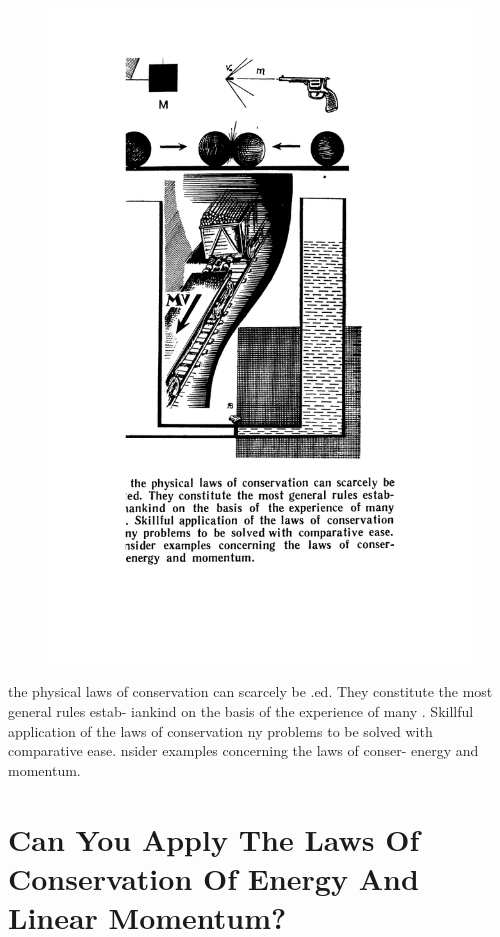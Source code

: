 \documentclass[a4paper,sfsidenotes]{tufte-book}
\begin{document}
\cleardoublepage
\thispagestyle{empty}
\vspace*{2cm}

\begin{figure}
\centering
\includegraphics[width=0.65\linewidth]{sec-d.pdf}
\end{figure}
\begin{fullwidth}
\begin{Large}
the physical laws of conservation can scarcely be
.ed. They constitute the most general rules estab-
iankind on the basis of the experience of many
. Skillful application of the laws of conservation
ny problems to be solved with comparative ease.
nsider examples concerning the laws of conser-
energy and momentum.
\end{Large}
\end{fullwidth}

\chapter{Can You Apply The Laws Of Conservation Of Energy And Linear Momentum?}
\label{ch-10}
\end{document}
